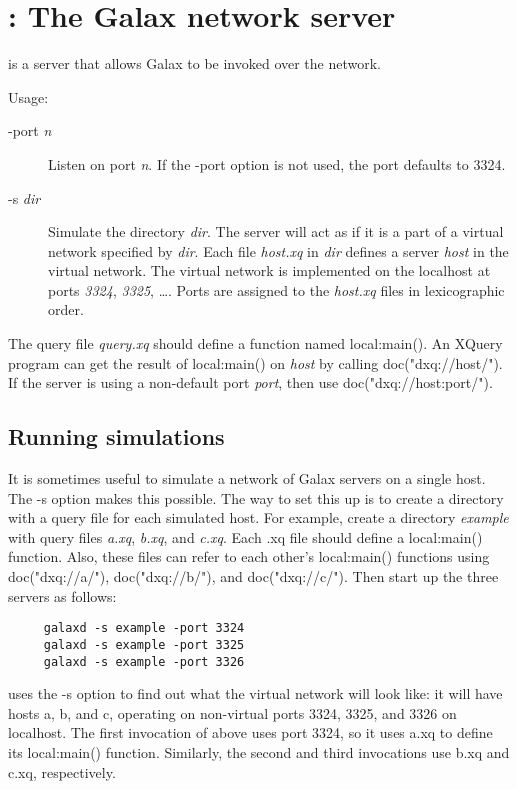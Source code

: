 \section{ : The Galax network server}

 is a server that allows Galax to be invoked over the  
network.

Usage: 

\begin{description}
\item[-port \emph{n}] Listen on port \emph{n}.  If the -port option is
   not used, the port defaults to 3324.
\item[-s \emph{dir}] Simulate the directory \emph{dir}.  The server
   will act as if it is a part of a virtual network specified by
   \emph{dir}.  Each file \emph{host.xq} in \emph{dir} defines a server
   \emph{host} in the virtual network.  The virtual network is
   implemented on the localhost at ports \emph{3324}, \emph{3325},
   \ldots.  Ports are assigned to the \emph{host.xq} files in
   lexicographic order.
\end{description}

The query file \emph{query.xq} should define a function named
local:main().  An XQuery program can get the result of local:main() on
\emph{host} by calling doc("dxq://host/").  If the server is using a
non-default port \emph{port}, then use doc("dxq://host:port/").

\subsection{Running simulations}
It is sometimes useful to simulate a network of Galax servers on a
single host.  The -s option makes this possible.  The way to set this
up is to create a directory with a query file for each simulated host.
For example, create a directory \emph{example} with query files
\emph{a.xq}, \emph{b.xq}, and \emph{c.xq}.  Each .xq file should
define a local:main() function.  Also, these files can refer to each
other's local:main() functions using doc("dxq://a/"), doc("dxq://b/"),
and doc("dxq://c/").  Then start up the three servers as follows:
\begin{verbatim}
     galaxd -s example -port 3324
     galaxd -s example -port 3325
     galaxd -s example -port 3326
\end{verbatim}
 uses the -s option to find out what the virtual network
will look like: it will have hosts a, b, and c, operating on
non-virtual ports 3324, 3325, and 3326 on localhost.  The first
invocation of  above uses port 3324, so it uses a.xq to
define its local:main() function.  Similarly, the second and third
invocations use b.xq and c.xq, respectively.

